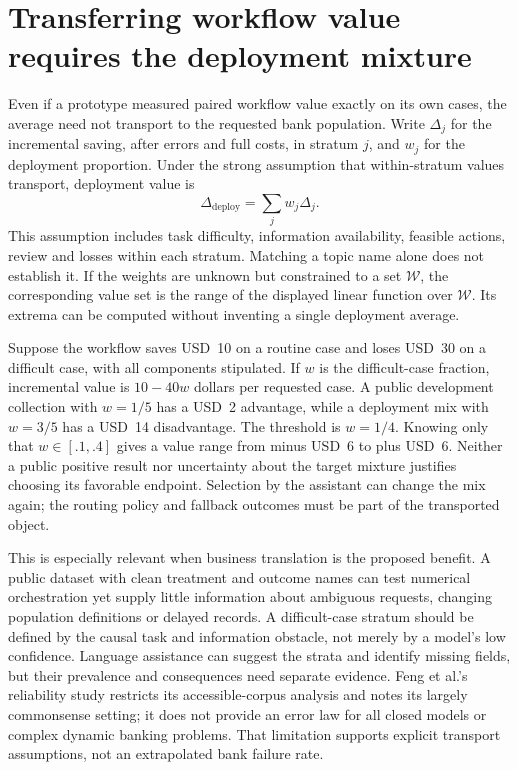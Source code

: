 \section{Transferring workflow value requires the deployment mixture}
\label{exec14:l8-transfer}

Even if a prototype measured paired workflow value exactly on its own cases,
the average need not transport to the requested bank population. Write
$\Delta_j$ for the incremental saving, after errors and full costs, in stratum
$j$, and $w_j$ for the deployment proportion. Under the strong assumption that
within-stratum values transport, deployment value is
\[
 \Delta_{\mathrm{deploy}}=\sum_j w_j\Delta_j.
\]
This assumption includes task difficulty, information availability, feasible
actions, review and losses within each stratum. Matching a topic name alone
does not establish it. If the weights are unknown but constrained to a set
$\mathcal W$, the corresponding value set is the range of the displayed linear
function over $\mathcal W$. Its extrema can be computed without inventing a
single deployment average. \citep{exec14_l8_economics}

Suppose the workflow saves USD~10 on a routine case and loses USD~30 on a
difficult case, with all components stipulated. If $w$ is the difficult-case
fraction, incremental value is $10-40w$ dollars per requested case. A public
development collection with $w=1/5$ has a USD~2 advantage, while a deployment
mix with $w=3/5$ has a USD~14 disadvantage. The threshold is $w=1/4$. Knowing
only that $w\in[.1,.4]$ gives a value range from minus USD~6 to plus USD~6.
Neither a public positive result nor uncertainty about the target mixture
justifies choosing its favorable endpoint. Selection by the assistant can
change the mix again; the routing policy and fallback outcomes must be part
of the transported object. \citep{exec14_l8_economics}

This is especially relevant when business translation is the proposed benefit.
A public dataset with clean treatment and outcome names can test numerical
orchestration yet supply little information about ambiguous requests, changing
population definitions or delayed records. A difficult-case stratum should be
defined by the causal task and information obstacle, not merely by a model's
low confidence. Language assistance can suggest the strata and identify missing
fields, but their prevalence and consequences need separate evidence. Feng
et al.'s reliability study restricts its accessible-corpus analysis and notes
its largely commonsense setting; it does not provide an error law for all
closed models or complex dynamic banking problems. That limitation supports
explicit transport assumptions, not an extrapolated bank failure rate.
\citep{v12_la_2407_19638}

